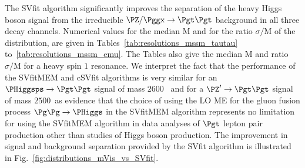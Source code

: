 The SVfit algorithm significantly improves the separation of the
heavy Higgs boson signal from the irreducible $\PZ/\Pggx \to \Pgt\Pgt$
background in all three decay channels.
Numerical values for the median $\textrm{M}$ and for the ratio $\sigma/\textrm{M}$ of the
distribution, are given in Tables~\ref{tab:resolutions_mssm_tautau}
to~\ref{tab:resolutions_mssm_emu}.
The Tables also give the median $\textrm{M}$ and ratio $\sigma/\textrm{M}$
for a heavy spin $1$ resonance.
We interpret the fact that the performance of the SVfitMEM and cSVfit algorithms is very similar for an $\PHiggsps \to \Pgt\Pgt$ signal of mass $2600$~\GeV
and for a $\PZ' \to \Pgt\Pgt$ signal of mass $2500$~\GeV as evidence that the choice of using
the LO ME for the gluon fusion process $\Pg\Pg \to \PHiggs$ in the SVfitMEM algorithm represents no limitation for using
the SVfitMEM algorithm in data analyses of $\Pgt$ lepton pair production other than studies of Higgs boson production.
The improvement in signal and background separation provided by the
SVfit algorithm is illustrated in Fig.~\ref{fig:distributions_mVis_vs_SVfit}.

